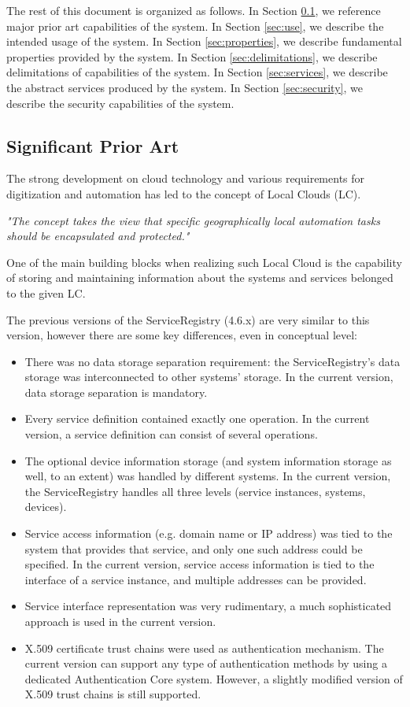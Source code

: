\documentclass[a4paper]{arrowhead}
\begin{document}
The rest of this document is organized as follows.
In Section \ref{sec:prior_art}, we reference major prior art capabilities
of the system.
In Section \ref{sec:use}, we describe the intended usage of the system.
In Section \ref{sec:properties}, we describe fundamental properties
provided by the system.
In Section \ref{sec:delimitations}, we describe delimitations of capabilities
of the system.
In Section \ref{sec:services}, we describe the abstract services produced by the system.
In Section \ref{sec:security}, we describe the security capabilities
of the system.

\subsection{Significant Prior Art}
\label{sec:prior_art}

The strong development on cloud technology and various requirements for digitization and automation has led to the concept of Local Clouds (LC).

\textit{"The concept takes the view that specific geographically local automation tasks should be encapsulated and protected."} \cite{jerker2017localclouds}

One of the main building blocks when realizing such Local Cloud is the capability of storing and maintaining information about the systems and services belonged to the given LC.

The previous versions of the ServiceRegistry (4.6.x) are very similar to this version, however there are some key differences, even in conceptual level:

\begin{itemize}
    \item There was no data storage separation requirement: the ServiceRegistry's data storage was interconnected to other systems' storage. In the current version, data storage separation is mandatory.
    \item Every service definition contained exactly one operation. In the current version, a service definition can consist of several operations.
    \item The optional device information storage (and system information storage as well, to an extent) was handled by different systems. In the current version, the ServiceRegistry handles all three levels (service instances, systems, devices).
    \item Service access information (e.g. domain name or IP address) was tied to the system that provides that service, and only one such address could be specified. In the current version, service access information is tied to the interface of a service instance, and multiple addresses can be provided.
    \item Service interface representation was very rudimentary, a much sophisticated approach is used in the current version.
    \item X.509 certificate trust chains were used as authentication mechanism. The current version can support any type of authentication methods by using a dedicated Authentication Core system. However, a slightly modified version of X.509 trust chains is still supported.
\end{itemize}
\end{document}
